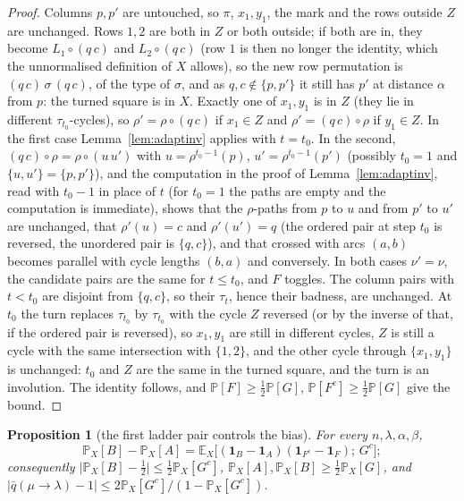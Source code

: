 \documentclass[11pt]{article}
\newtheorem{proposition}[theorem]{Proposition}
\theoremstyle{definition}
\newcommand{\E}{\mathbb{E}}
\renewcommand{\Pr}{\mathbb{P}}
\begin{document}
\begin{proof}
Columns $p,p'$ are untouched, so $\pi$, $x_1,y_1$, the mark and the rows outside $Z$ are
unchanged.  Rows $1,2$ are both in $Z$ or both outside; if both are in, they become
$L_1\circ(q\,c)$ and $L_2\circ(q\,c)$ (row $1$ is then no longer the identity, which the
unnormalised definition of $X$ allows), so the new row permutation is
$(q\,c)\,\sigma\,(q\,c)$, of the type of $\sigma$, and as $q,c\notin\{p,p'\}$ it still has
$p'$ at distance $\alpha$ from $p$: the turned square is in $X$.  Exactly one of $x_1,y_1$
is in $Z$ (they lie in different $\tau_{t_0}$-cycles), so $\rho'=\rho\circ(q\,c)$ if
$x_1\in Z$ and $\rho'=(q\,c)\circ\rho$ if $y_1\in Z$.  In the first case
Lemma~\ref{lem:adaptinv} applies with $t=t_0$.  In the second,
$(q\,c)\circ\rho=\rho\circ(u\,u')$ with $u=\rho^{t_0-1}(p)$, $u'=\rho^{t_0-1}(p')$
(possibly $t_0=1$ and $\{u,u'\}=\{p,p'\}$), and the computation in the proof of
Lemma~\ref{lem:adaptinv}, read with $t_0-1$ in place of $t$ (for $t_0=1$ the paths are
empty and the computation is immediate), shows that the $\rho$-paths from $p$ to $u$ and
from $p'$ to $u'$ are unchanged, that $\rho'(u)=c$ and $\rho'(u')=q$ (the
ordered pair at step $t_0$ is reversed, the unordered pair is $\{q,c\}$), and that crossed
with arcs $(a,b)$ becomes parallel with cycle lengths $(b,a)$ and conversely.  In both
cases $\nu'=\nu$, the candidate pairs are the same for $t\le t_0$, and $F$ toggles.  The
column pairs with $t<t_0$ are disjoint from $\{q,c\}$, so their $\tau_t$, hence their
badness, are unchanged.  At $t_0$ the turn replaces $\tau_{t_0}$ by $\tau_{t_0}$ with the
cycle $Z$ reversed (or by the inverse of that, if the ordered pair is reversed), so $x_1,y_1$
are still in different cycles, $Z$ is still a cycle with the same intersection with
$\{1,2\}$, and the other cycle through $\{x_1,y_1\}$ is unchanged: $t_0$ and $Z$ are the
same in the turned square, and the turn is an involution.  The identity follows, and
$\Pr[F]\ge\tfrac12\Pr[G]$, $\Pr[F^c]\ge\tfrac12\Pr[G]$ give the bound.
\end{proof}

\begin{proposition}[the first ladder pair controls the bias]\label{prop:firstpairbias}
For every $n,\lambda,\alpha,\beta$,
\[
\Pr_X[B]-\Pr_X[A]=\E_X\bigl[(\mathbf 1_B-\mathbf 1_A)(\mathbf 1_{F^c}-\mathbf 1_F);\,G^c\bigr];
\]
consequently $\bigl|\Pr_X[B]-\tfrac12\bigr|\le\tfrac12\Pr_X[G^c]$,
$\Pr_X[A],\Pr_X[B]\ge\tfrac12\Pr_X[G]$, and
$|\bar q(\mu\to\lambda)-1|\le2\Pr_X[G^c]/(1-\Pr_X[G^c])$.
\end{proposition}
\end{document}
